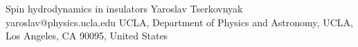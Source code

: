 \begin{conf-abstract}[]
{Spin hydrodynamics in insulators}
{\color{blue} Yaroslav Tserkovnyak}
{yaroslav@physics.ucla.edu}
{UCLA, Department of Physics and Astronomy, UCLA, Los Angeles, CA 90095, United States}
{\decofourleft \decofourright}





\printbibliography[heading=none]

\end{conf-abstract}
